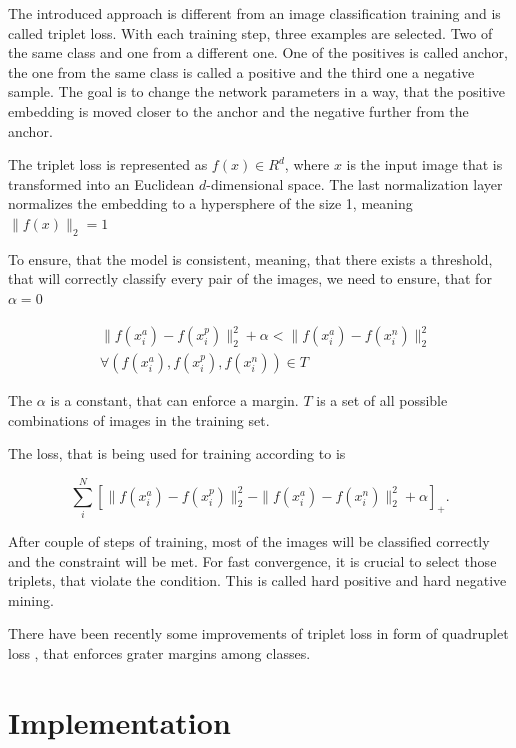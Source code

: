 \documentclass[a4paper,12pt,titlepage]{article}
\numberwithin{figure}{section}
\begin{document}
The introduced approach is different from an image classification training and is called triplet loss. With each training step, three examples are selected. Two of the same class and one from a different one. One of the positives is called anchor, the one from the same class is called a positive and the third one a negative sample. The goal is to change the network parameters in a way, that the positive embedding is moved closer to the anchor and the negative further from the anchor.

The triplet loss is represented as $f(x) \in R^d$, where $x$ is the input image that is transformed into an Euclidean $d$-dimensional space. The last normalization layer normalizes the embedding to a hypersphere of the size 1, meaning $\|f(x)\|_2 = 1$ 

To ensure, that the model is consistent, meaning, that there exists a threshold, that will correctly classify every pair of the images, we need to ensure, that for $\alpha = 0$

\begin{equation}
\begin{aligned}
&\|f(x_i^a) - f(x_i^p)\|^2_2 + \alpha < \|f(x_i^a) - f(x_i^n)\|^2_2 \\
&\forall (f(x_i^a), f(x_i^p), f(x_i^n)) \in T
\end{aligned}
\end{equation}

The $\alpha$ is a constant, that can enforce a margin. $T$ is a set of all possible combinations of images in the training set.

The loss, that is being used for training according to \cite{szegedy2016rethinking} is 

\begin{equation}
\sum_i^N [\|f(x_i^a) - f(x_i^p)\|^2_2 - \|f(x_i^a) - f(x_i^n)\|^2_2 + \alpha]_+.
\end{equation}

After couple of steps of training, most of the images will be classified correctly and the constraint will be met. For fast convergence, it is crucial to select those triplets, that violate the condition. This is called hard positive and hard negative mining.

There have been recently some improvements of triplet loss in form of quadruplet loss \cite{chen2017beyond}, that enforces grater margins among classes.





\section{Implementation}
\end{document}
